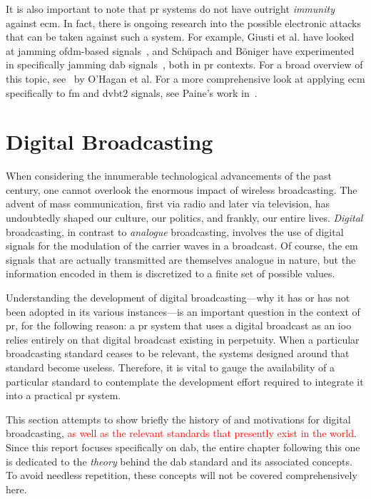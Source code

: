 \documentclass[class=report,11pt,crop=false]{standalone}
\begin{document}
It is also important to note that \gls{pr} systems do not have outright \emph{immunity} against \gls{ecm}. In fact, there is ongoing research into the possible electronic attacks that can be taken against such a system. For example, Giusti et al. have looked at jamming \gls{ofdm}-based signals~\cite{Giusti2018}, and Sch\"upach and B\"oniger have experimented in specifically jamming \gls{dab} signals~\cite{schupbach2016}, both in \gls{pr} contexts. For a broad overview of this topic, see~\cite{OHagan2019} by O'Hagan et al. For a more comprehensive look at applying \gls{ecm} specifically to \gls{fm} and \gls{dvbt2} signals, see Paine's work in~\cite{painePHD2019}.

\section{Digital Broadcasting}
When considering the innumerable technological advancements of the past century, one cannot overlook the enormous impact of wireless broadcasting. The advent of mass communication, first via radio and later via television, has undoubtedly shaped our culture, our politics, and frankly, our entire lives. \emph{Digital} broadcasting, in contrast to \emph{analogue} broadcasting, involves the use of digital signals for the modulation of the carrier waves in a broadcast. Of course, the \gls{em} signals that are actually transmitted are themselves analogue in nature, but the information encoded in them is discretized to a finite set of possible values.

Understanding the development of digital broadcasting---why it has or has not been adopted in its various instances---is an important question in the context of \gls{pr}, for the following reason: a \gls{pr} system that uses a digital broadcast as an \gls{ioo} relies entirely on that digital broadcast existing in perpetuity. When a particular broadcasting standard ceases to be relevant, the systems designed around that standard become useless. Therefore, it is vital to gauge the availability of a particular standard to contemplate the development effort required to integrate it into a practical \gls{pr} system.

This section attempts to show briefly the history of and motivations for digital broadcasting, \textcolor{red}{as well as the relevant standards that presently exist in the world}. Since this report focuses specifically on \gls{dab}, the entire chapter following this one is dedicated to the \emph{theory} behind the \gls{dab} standard and its associated concepts. To avoid needless repetition, these concepts will not be covered comprehensively here.
\end{document}
